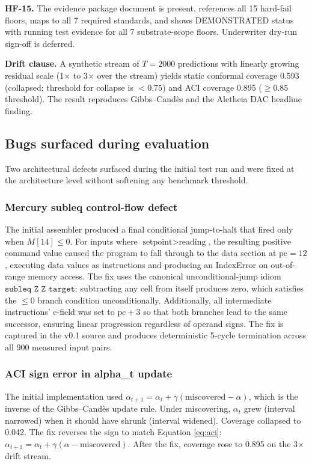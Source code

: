 \documentclass[conference]{IEEEtran}
\theoremstyle{definition}
\theoremstyle{plain}
\theoremstyle{remark}
\begin{document}
\textbf{HF-15.} The evidence package document is present, references all 15 hard-fail floors, maps to all 7 required standards, and shows DEMONSTRATED status with running test evidence for all 7 substrate-scope floors. Underwriter dry-run sign-off is deferred.

\textbf{Drift clause.} A synthetic stream of $T = 2000$ predictions with linearly growing residual scale (1$\times$ to 3$\times$ over the stream) yields static conformal coverage 0.593 (collapsed; threshold for collapse is $< 0.75$) and ACI coverage 0.895 ($\geq 0.85$ threshold). The result reproduces Gibbs--Cand{\`e}s \cite{gibbs_aci_2021} and the Aletheia DAC headline finding.

\subsection{Bugs surfaced during evaluation}

Two architectural defects surfaced during the initial test run and were fixed at the architecture level without softening any benchmark threshold.

\subsubsection{Mercury subleq control-flow defect}

The initial assembler produced a final conditional jump-to-halt that fired only when $M[14] \leq 0$. For inputs where $\text{setpoint} > \text{reading}$, the resulting positive command value caused the program to fall through to the data section at $\text{pc}=12$, executing data values as instructions and producing an IndexError on out-of-range memory access. The fix uses the canonical unconditional-jump idiom $\texttt{subleq Z Z target}$: subtracting any cell from itself produces zero, which satisfies the $\leq 0$ branch condition unconditionally. Additionally, all intermediate instructions' c-field was set to $\text{pc}+3$ so that both branches lead to the same successor, ensuring linear progression regardless of operand signs. The fix is captured in the v0.1 source and produces deterministic 5-cycle termination across all 900 measured input pairs.

\subsubsection{ACI sign error in alpha\_t update}

The initial implementation used $\alpha_{t+1} = \alpha_t + \gamma(\text{miscovered} - \alpha)$, which is the inverse of the Gibbs--Cand{\`e}s update rule. Under miscovering, $\alpha_t$ grew (interval narrowed) when it should have shrunk (interval widened). Coverage collapsed to 0.042. The fix reverses the sign to match Equation \eqref{eq:aci}: $\alpha_{t+1} = \alpha_t + \gamma(\alpha - \text{miscovered})$. After the fix, coverage rose to 0.895 on the 3$\times$ drift stream.
\end{document}
